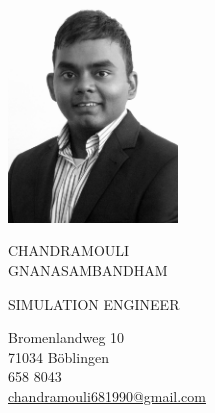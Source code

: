 \documentclass{mycv}
\begin{document}
\sloppy %
\color{templateColor1}
\AddToShipoutPicture{\BackgroundPic}

\normalfont
\begin{minipage}[c]{0.3\textwidth}
	\centering
	\includegraphics[width=4.5cm,height=6cm]{img/CV_Photo.jpg}
\end{minipage}
\begin{minipage}[]{0.7\textwidth}

  \vspace{5mm}
	{\Huge CHANDRAMOULI}\\

	{\Huge GNANASAMBANDHAM}
	\vspace{2mm}

	{\large SIMULATION ENGINEER}
	\vspace{2mm}

  Bromenlandweg 10\\
	71034 B{\"o}blingen\\

	 658 8043\\
	\mailIcon \href{mailto:chandramouli681990@gmail.com}{chandramouli681990@gmail.com}
  
  \vspace{10mm}
\end{minipage}
\end{document}
